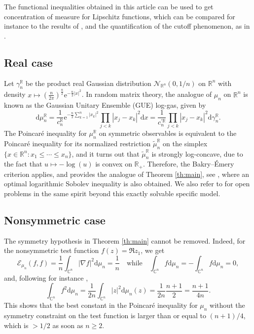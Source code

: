\documentclass[11pt,reqno]{amsart}
\numberwithin{equation}{section}%
\numberwithin{figure}{section}%
\numberwithin{table}{section}
\theoremstyle{plain}
\theoremstyle{definition}
\begin{document}
The functional inequalities obtained in this article can be used to get
concentration of measure for Lipschitz functions, which can be compared for
instance to the results of \cite*{ChafaiHardyMaida}, and the quantification of
the cutoff phenomenon, as in \cite*{ChafaiFathiCutoff}.

\subsection{Real case}

Let $\gamma_n^{\mathbb{R}}$ be the product real Gaussian distribution
$\mathcal{N}_{\mathbb{R}^n}(0,1/n)$ on $\mathbb{R}^n$ with density
$x\mapsto(\frac{n}{2\pi})^{\frac{n}{2}}\mathrm{e}^{-\frac{n}{2}|x|^2}$. In
random matrix theory, the analogue of $\mu_n$ on $\mathbb{R}^n$ is known as
the Gaussian Unitary Ensemble (GUE) log-gas, given by
\begin{equation}\label{eq:muR}
  \mathrm{d}\mu_n^{\mathbb{R}}
  =\frac{1}{c_n^{\mathbb{R}}}\mathrm{e}^{-\frac{n}{2}\sum_{k=1}^n|x_k|^2}\prod_{j<k}|x_j-x_k|^2\mathrm{d}x
  =\frac{1}{c_n^{'\mathbb{R}}}\prod_{j<k}|x_j-x_k|^2\mathrm{d}\gamma_n^{\mathbb{R}}.
\end{equation}
The Poincaré inequality for $\mu_n^{\mathbb{R}}$ on symmetric observables is
equivalent to the Poincaré inequality for its normalized restriction
$\widetilde{\mu}_n^{\mathbb{R}}$ on the simplex
$\{x\in\mathbb{R}^n:x_1\leq\cdots\leq x_n\}$, and it turns out that
$\widetilde{\mu}_n^{\mathbb{R}}$ is strongly log-concave, due to the fact that
$u\mapsto-\log(u)$ is convex on $\mathbb{R}_+$. Therefore, the Bakry--Émery
criterion applies, and provides the analogue of Theorem \ref{th:main}, see
\cite{ChafaiLehec}, where an optimal logarithmic Sobolev inequality is also
obtained. We also refer to \cite{RosenzweigSerfatyModulatedLSI} for open
problems in the same spirit beyond this exactly solvable specific model.

\subsection{Nonsymmetric case}

The symmetry hypothesis in Theorem \ref{th:main} cannot be removed. Indeed,
for the nonsymmetric test function $f(z)=\Re z_1$, we get
\begin{equation}
  \mathcal{E}_{\mu_n}(f,f)=\frac{1}{n}\int_{\mathbb{C}^n}|\nabla f|^2\mathrm{d}\mu_n=\frac{1}{n}
  \quad\text{while}\quad
  \int_{\mathbb{C}^n}f\mathrm{d}\mu_n
  =-\int_{\mathbb{C}^n}f\mathrm{d}\mu_n
  =0,
\end{equation}
and, following for instance \cite[Cor.~6.2]{ChafaiAspects},
\begin{equation}
  \int_{\mathbb{C}^n}f^2\mathrm{d}\mu_n
  =\frac{1}{2n}\int_{\mathbb{C}^n}|z|^2\mathrm{d}\mu_n(z)
  =\frac{1}{2n}\frac{n+1}{2}=\frac{n+1}{4n}.
\end{equation}
This shows that the best constant in the Poincaré inequality for $\mu_n$
without the symmetry constraint on the test function is larger than or equal
to $(n+1)/4$, which is $>1/2$ as soon as $n\geq2$.
\end{document}
